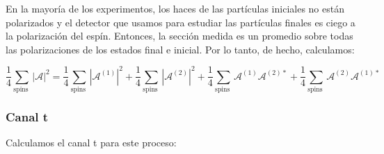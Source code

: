 En la mayoría de los experimentos, los haces de las partículas iniciales no están polarizados y el detector que usamos para estudiar las partículas finales es ciego a la polarización del espín. Entonces, la sección medida es un promedio sobre todas las polarizaciones de los estados final e inicial. Por lo tanto, de hecho, calculamos:

\begin{equation}
  \frac{1}{4} \sum_{\text {spins }}|\mathcal{A}|^2=\frac{1}{4} \sum_{\text {spins }}\left|\mathcal{A}^{(1)}\right|^2+\frac{1}{4} \sum_{\text {spins }}\left|\mathcal{A}^{(2)}\right|^2+\frac{1}{4} \sum_{\text {spins }} \mathcal{A}^{(1)} \mathcal{A}^{(2) *}+\frac{1}{4} \sum_{\text {spins }} \mathcal{A}^{(2)} \mathcal{A}^{(1) *}
  \end{equation}

\subsubsection{Canal t}
Calculamos el canal t para  este proceso: 
